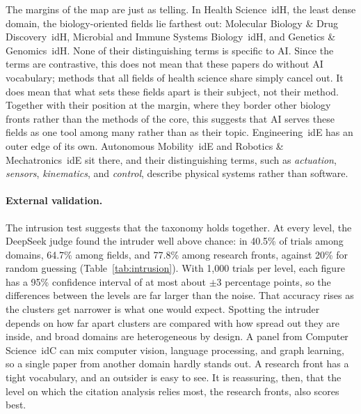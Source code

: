 \documentclass[10pt,twocolumn,a4paper]{article}
\newcommand{\cl}[3]{\textsf{#1}~\csname id#2\endcsname{#3}}
\begin{document}
	The margins of the map are just as telling. In \cl{Health Science}{H}{1}, the least dense domain, the biology-oriented fields lie farthest out: \cl{Molecular Biology \& Drug Discovery}{H}{13}, \cl{Microbial and Immune Systems Biology}{H}{14}, and \cl{Genetics \& Genomics}{H}{15}. None of their distinguishing terms is specific to AI. Since the terms are contrastive, this does not mean that these papers do without AI vocabulary; methods that all fields of health science share simply cancel out. It does mean that what sets these fields apart is their subject, not their method. Together with their position at the margin, where they border other biology fronts rather than the methods of the core, this suggests that AI serves these fields as one tool among many rather than as their topic. \cl{Engineering}{E}{4} has an outer edge of its own. \cl{Autonomous Mobility}{E}{44} and \cl{Robotics \& Mechatronics}{E}{45} sit there, and their distinguishing terms, such as \textit{actuation}, \textit{sensors}, \textit{kinematics}, and \textit{control}, describe physical systems rather than software.
	
	\paragraph{External validation.} The intrusion test suggests that the taxonomy holds together. At every level, the DeepSeek judge found the intruder well above chance: in 40.5\% of trials among domains, 64.7\% among fields, and 77.8\% among research fronts, against 20\% for random guessing (Table~\ref{tab:intrusion}). With 1,000 trials per level, each figure has a 95\% confidence interval of at most about $\pm$3 percentage points, so the differences between the levels are far larger than the noise. That accuracy rises as the clusters get narrower is what one would expect. Spotting the intruder depends on how far apart clusters are compared with how spread out they are inside, and broad domains are heterogeneous by design. A panel from \cl{Computer Science}{C}{0} can mix computer vision, language processing, and graph learning, so a single paper from another domain hardly stands out. A research front has a tight vocabulary, and an outsider is easy to see. It is reassuring, then, that the level on which the citation analysis relies most, the research fronts, also scores best.
	
\end{document}
